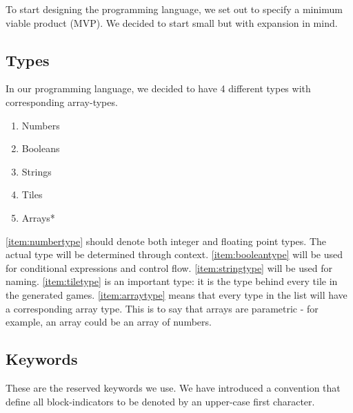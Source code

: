 To start designing the programming language, we set out to specify a minimum viable product (MVP). We decided to start small but with expansion in mind.

\subsection{Types}
In our programming language, we decided to have 4 different types with corresponding array-types.

\begin{multicols}{3}
\begin{enumerate}
    \item Numbers\label{item:numbertype}
    \item Booleans\label{item:booleantype}
    \item Strings\label{item:stringtype}
    \item Tiles\label{item:tiletype}
    \item Arrays*\label{item:arraytype}
\end{enumerate}
\end{multicols}

\ref{item:numbertype} should denote both integer and floating point types. The actual type will be determined through context. \ref{item:booleantype} will be used for conditional expressions and control flow.
\ref{item:stringtype} will be used for naming.
\ref{item:tiletype} is an important type: it is the type behind every tile in the generated games.
\ref{item:arraytype} means that every type in the list will have a corresponding array type. This is to say that arrays are parametric - for example, an array could be an array of numbers.


\subsection{Keywords}
These are the reserved keywords we use. We have introduced a convention that define all block-indicators to be denoted by an upper-case first character.

